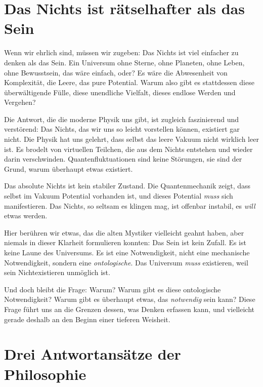 \section{Das Nichts ist rätselhafter als das Sein}

Wenn wir ehrlich sind, müssen wir zugeben: Das Nichts ist viel einfacher zu denken als das Sein. Ein Universum ohne Sterne, ohne Planeten, ohne Leben, ohne Bewusstsein, das wäre \glqq einfach\grqq{}, oder? Es wäre die Abwesenheit von Komplexität, die Leere, das pure Potential. Warum also gibt es stattdessen diese überwältigende Fülle, diese unendliche Vielfalt, dieses endlose Werden und Vergehen?

Die Antwort, die die moderne Physik uns gibt, ist zugleich faszinierend und verstörend: Das Nichts, das wir uns so leicht vorstellen können, existiert gar nicht. Die Physik hat uns gelehrt, dass selbst das \glqq leere\grqq{} Vakuum nicht wirklich leer ist. Es brodelt von virtuellen Teilchen, die aus dem Nichts entstehen und wieder darin verschwinden. Quantenfluktuationen sind keine Störungen, sie sind der Grund, warum überhaupt etwas existiert.

\begin{satz}
	Das absolute Nichts ist kein stabiler Zustand. Die Quantenmechanik zeigt, dass selbst im Vakuum Potential vorhanden ist, und dieses Potential \emph{muss} sich manifestieren. Das Nichts, so seltsam es klingen mag, ist offenbar instabil, es \emph{will} etwas werden.
\end{satz}

Hier berühren wir etwas, das die alten Mystiker vielleicht geahnt haben, aber niemals in dieser Klarheit formulieren konnten: Das Sein ist kein Zufall. Es ist keine Laune des Universums. Es ist eine Notwendigkeit, nicht eine mechanische Notwendigkeit, sondern eine \emph{ontologische}. Das Universum \emph{muss} existieren, weil sein Nichtexistieren unmöglich ist.

Und doch bleibt die Frage: Warum? Warum gibt es diese ontologische Notwendigkeit? Warum gibt es überhaupt etwas, das \emph{notwendig} sein kann? Diese Frage führt uns an die Grenzen dessen, was Denken erfassen kann, und vielleicht gerade deshalb an den Beginn einer tieferen Weisheit.

\section{Drei Antwortansätze der Philosophie}


